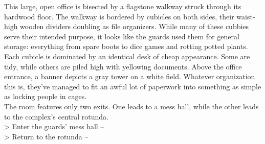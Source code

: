 This large, open office is bisected by a flagstone walkway struck through its hardwood floor. The walkway is bordered by cubicles on both sides, their waist-high wooden dividers doubling as file organizers. While many of these cubbies serve their intended purpose, it looks like the guards used them for general storage: everything from spare boots to dice games and rotting potted plants.\\

Each cubicle is dominated by an identical desk of cheap appearance. Some are tidy, while others are piled high with yellowing documents. Above the office entrance, a banner depicts a gray tower on a white field. Whatever organization this is, they've managed to fit an awful lot of paperwork into something as simple as locking people in cages.\\

The room features only two exits. One leads to a mess hall, while the other leads to the complex's central rotunda.\\

> Enter the guards’ mess hall -- \\
> Return to the rotunda -- 